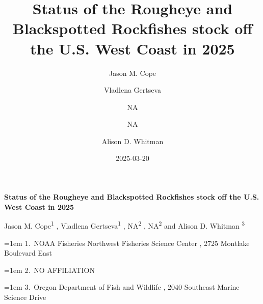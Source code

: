 \documentclass[
]{scrartcl}
\title{Status of the Rougheye and Blackspotted Rockfishes stock off the
U.S. West Coast in 2025}
\author{Jason M. Cope \and Vladlena Gertseva \and NA \and NA \and Alison
D. Whitman}
\date{2025-03-20}
\begin{document}
  \begin{titlepage}

  \begin{minipage}[b][\textheight][s]{\textwidth}


  \raggedright




  {\huge\bfseries\nohyphens{Status of the Rougheye and Blackspotted
  Rockfishes stock off the U.S. West Coast in 2025}}\\[1\baselineskip]



  \vspace{1\baselineskip}


  \vspace{1\baselineskip}

   {\large{Jason M. Cope}}{\textsuperscript{1}}%
  ,
   {\large{Vladlena Gertseva}}{\textsuperscript{1}}%
  ,
   {\large{NA}}{\textsuperscript{2}}%
  ,
   {\large{NA}}{\textsuperscript{2}}%
  { and \large{Alison D. Whitman}}%
  {\textsuperscript{3}}%



  \vspace{2\baselineskip}

  \hangindent=1em
  {1}.~{NOAA Fisheries Northwest Fisheries Science Center}%
  , %
  {2725 Montlake Boulevard East}%
  \par\hangindent=1em%
  {2}.~{NO AFFILIATION}%
  \par\hangindent=1em%
  {3}.~{Oregon Department of Fish and Wildlife}%
  , %
  {2040 Southeast Marine Science Drive}%



\end{minipage}
\end{titlepage}
\end{document}
